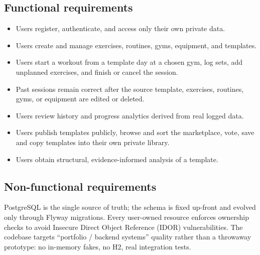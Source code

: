 \documentclass[11pt,a4paper]{article}
\begin{document}
\subsection{Functional requirements}
\begin{itemize}[noitemsep]
  \item Users register, authenticate, and access only their own private data.
  \item Users create and manage exercises, routines, gyms, equipment, and templates.
  \item Users start a workout from a template day at a chosen gym, log sets, add unplanned
        exercises, and finish or cancel the session.
  \item Past sessions remain correct after the source template, exercises, routines, gyms, or
        equipment are edited or deleted.
  \item Users review history and progress analytics derived from real logged data.
  \item Users publish templates publicly, browse and sort the marketplace, vote, save and copy
        templates into their own private library.
  \item Users obtain structural, evidence-informed analysis of a template.
\end{itemize}

\subsection{Non-functional requirements}
PostgreSQL is the single source of truth; the schema is fixed up-front and evolved only through
Flyway migrations. Every user-owned resource enforces ownership checks to avoid Insecure Direct
Object Reference (IDOR) vulnerabilities. The codebase targets ``portfolio / backend systems''
quality rather than a throwaway prototype: no in-memory fakes, no H2, real integration tests.
\end{document}
